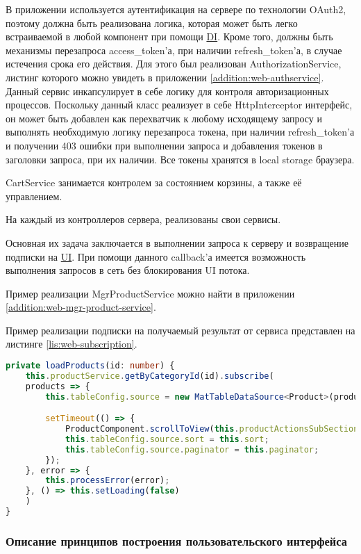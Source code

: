 В приложении используется аутентификация на сервере по технологии OAuth2, поэтому должна быть реализована логика, 
которая может быть легко встраиваемой в любой компонент при помощи \hyperlink{gloss:di}{DI}. 
Кроме того, должны быть механизмы перезапроса access\_token’а, при наличии refresh\_token’а, в случае истечения срока его действия.
Для этого был реализован AuthorizationService, листинг которого можно увидеть в приложении \ref{addition:web-authservice}.
Данный сервис инкапсулирует в себе логику для контроля авторизационных процессов.
Поскольку данный класс реализует в себе HttpInterceptor интерфейс, он может быть добавлен как перехватчик к любому исходящему запросу и выполнять необходимую логику перезапроса токена, при наличии refresh\_token’а и получении 403 ошибки при выполнении запроса и добавления токенов в заголовки запроса, при их наличии.
Все токены хранятся в local storage браузера.

CartService занимается контролем за состоянием корзины, а также её управлением.

На каждый из контроллеров сервера, реализованы свои сервисы.

Основная их задача заключается в выполнении запроса к серверу и возвращение подписки на \hyperlink{gloss:ui}{UI}.
При помощи данного callback’а имеется возможность выполнения запросов в сеть без блокирования UI потока.

Пример реализации MgrProductService можно найти в приложении \ref{addition:web-mgr-product-service}.

Пример реализации подписки на получаемый результат от сервиса представлен на листинге \ref{lis:web-subscription}.

\begin{lstlisting}[language=TypeScript, captionpos=b,
label={lis:web-subscription},
caption={Пример реализации подписки на ожидаемый результат от сервера}
]
private loadProducts(id: number) {
    this.productService.getByCategoryId(id).subscribe(
    products => {
        this.tableConfig.source = new MatTableDataSource<Product>(products);

        setTimeout(() => {
            ProductComponent.scrollToView(this.productActionsSubSection);
            this.tableConfig.source.sort = this.sort;
            this.tableConfig.source.paginator = this.paginator;
        });
    }, error => {
        this.processError(error);
    }, () => this.setLoading(false)
    )
}
\end{lstlisting}

\subsubsection{Описание принципов построения пользовательского интерфейса}\indent

